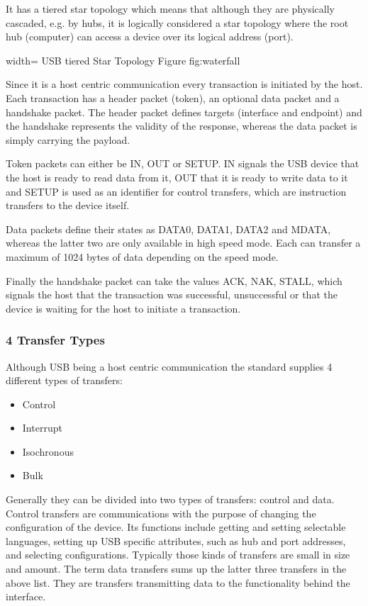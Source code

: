 It has a tiered star topology which means that although they are physically cascaded, e.g. by hubs, it is logically considered a star topology where the 
root hub (computer) can access a device over its logical address (port).

 {width=\textwidth}%
 {USB tiered Star Topology \cite{USBTOPOLOGY}}%
 {Figure}%
 {fig:waterfall}%
 
Since it is a host centric communication every transaction is initiated by the host. Each transaction has a header packet (token), an optional data 
packet and a handshake packet. The header packet defines targets (interface and endpoint) and the handshake represents the validity of the response, 
whereas the data packet is simply carrying the payload.

Token packets can either be IN, OUT or SETUP. IN signals the USB device that the host is ready to read data from it, OUT that it is ready to write data 
to it and SETUP is used as an identifier for control transfers, which are instruction transfers to the device itself.

Data packets define their states as DATA0, DATA1, DATA2 and MDATA, whereas the latter two are only available in high speed mode. Each can transfer a 
maximum of 1024 bytes of data depending on the speed mode.

Finally the handshake packet can take the values ACK, NAK, STALL, which signals the host that the transaction was successful, unsuccessful or that the 
device is waiting for the host to initiate a transaction.%

\subsubsection{4 Transfer Types}

Although USB being a host centric communication the standard supplies 4 different types of transfers: 

\begin{itemize}
 \item Control
 \item Interrupt
 \item Isochronous
 \item Bulk
\end{itemize}

Generally they can be divided into two types of transfers: control and data. Control transfers are communications with the purpose of changing the 
configuration of the device. Its functions include getting and setting selectable languages, setting up USB specific attributes, such as hub and port 
addresses, and selecting configurations. Typically those kinds of transfers are small in size and amount. 
The term data transfers sums up the latter three transfers in the above list. They are transfers transmitting data to the functionality 
behind the interface.%

